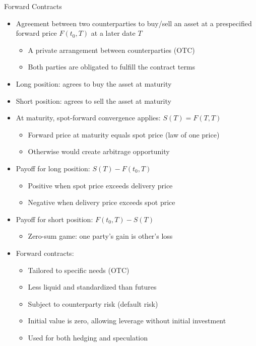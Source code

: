 \documentclass[10pt,handout]{beamer}
\begin{document}
\begin{frame}{Forward Contracts}
  \begin{itemize}[<+->]
    \item Agreement between two counterparties to buy/sell an asset at a prespecified forward price $F(t_0, T)$ at a later date $T$
      \begin{itemize}
        \item A private arrangement between counterparties (OTC)
        \item Both parties are obligated to fulfill the contract terms
      \end{itemize}
    \item Long position: agrees to buy the asset at maturity
    \item Short position: agrees to sell the asset at maturity
    \item At maturity, spot-forward convergence applies: $S(T) = F(T, T)$
      \begin{itemize}
        \item Forward price at maturity equals spot price (law of one price)
        \item Otherwise would create arbitrage opportunity
      \end{itemize}
    \item Payoff for long position: $S(T) - F(t_0, T)$
      \begin{itemize}
        \item Positive when spot price exceeds delivery price
        \item Negative when delivery price exceeds spot price
      \end{itemize}
    \item Payoff for short position: $F(t_0, T) - S(T)$
      \begin{itemize}
        \item Zero-sum game: one party's gain is other's loss
      \end{itemize}
    \item Forward contracts:
      \begin{itemize}
        \item Tailored to specific needs (OTC)
        \item Less liquid and standardized than futures
        \item Subject to counterparty risk (default risk)
        \item Initial value is zero, allowing leverage without initial investment
        \item Used for both hedging and speculation
      \end{itemize}
  \end{itemize}
\end{frame}
\end{document}
